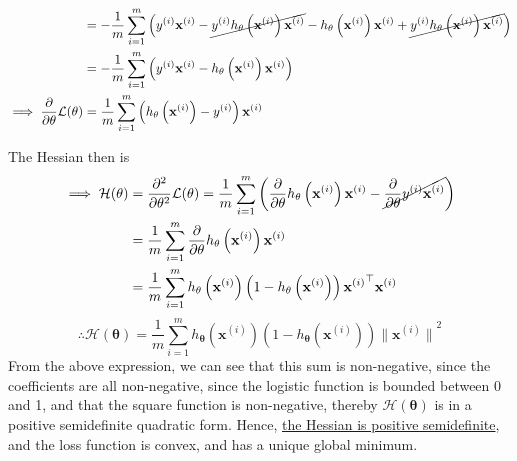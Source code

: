 \begin{align*}
     & =
    -\frac{1}{m} \sum_{i=1}^{m}
    \Big(
    y^{(i)} \mathbf{x}^{(i)}
    -
    \cancel{y^{(i)} h_{\mathbf{\theta}}\left(\mathbf{x}^{(i)}\right) \mathbf{x}^{(i)}}
    -
    h_{\mathbf{\theta}}\left(\mathbf{x}^{(i)}\right) \mathbf{x}^{(i)}
    +
    \cancel{y^{(i)} h_{\mathbf{\theta}}\left(\mathbf{x}^{(i)}\right) \mathbf{x}^{(i)}}
    \Big)
    \\ & =
    -\frac{1}{m} \sum_{i=1}^{m}
    \left(
    y^{(i)} \mathbf{x}^{(i)}
    -
    h_{\mathbf{\theta}}\left(\mathbf{x}^{(i)}\right) \mathbf{x}^{(i)}
    \right)
    \\
    \implies
    \frac{\partial}{\partial \mathbf{\theta}} \mathcal{L}(\mathbf{\theta})
     & =
    \frac{1}{m} \sum_{i=1}^{m}
    \left(
    h_{\mathbf{\theta}}\left(\mathbf{x}^{(i)}\right)
    -
    y^{(i)}
    \right)
    \mathbf{x}^{(i)}
\end{align*}

The Hessian then is
\begin{align*}
    \implies
    \mathcal{H}(\mathbf{\theta})
     & =
    \frac{\partial^2}{\partial \mathbf{\theta}^2} \mathcal{L}(\mathbf{\theta})
    =
    \frac{1}{m} \sum_{i=1}^{m}
    \left(
    \frac{\partial}{\partial \mathbf{\theta}} h_{\mathbf{\theta}}\left(\mathbf{x}^{(i)}\right) \mathbf{x}^{(i)}
    -
    \cancel{\frac{\partial}{\partial \mathbf{\theta}} y^{(i)} \mathbf{x}^{(i)}}
    \right)
    \\ & =
    \frac{1}{m} \sum_{i=1}^{m}
    \frac{\partial}{\partial \mathbf{\theta}} h_{\mathbf{\theta}}\left(\mathbf{x}^{(i)}\right) \mathbf{x}^{(i)}
    \\ & =
    \frac{1}{m} \sum_{i=1}^{m}
    h_{\mathbf{\theta}}\left(\mathbf{x}^{(i)}\right) \left(1-h_{\mathbf{\theta}}\left(\mathbf{x}^{(i)}\right)\right) {\mathbf{x}^{(i)}}^\top \mathbf{x}^{(i)}
\end{align*}
\begin{equation*}
    \therefore
    \boxed{
        \mathcal{H}(\mathbf{\theta})
        =
        \frac{1}{m} \sum_{i=1}^{m}
        h_{\mathbf{\theta}}\left(\mathbf{x}^{(i)}\right) \left(1-h_{\mathbf{\theta}}\left(\mathbf{x}^{(i)}\right)\right)
        {\lVert \mathbf{x}^{(i)} \rVert}^2
    }
\end{equation*}
From the above expression, we can see that this sum is non-negative, since the coefficients are all non-negative, since the logistic function is bounded between 0 and 1, and that the square function is non-negative, thereby \( \mathcal{H}(\mathbf{\theta}) \) is in a positive semidefinite quadratic form.
Hence, \underline{the Hessian is positive semidefinite}, and the loss function is convex, and has a unique global minimum.

